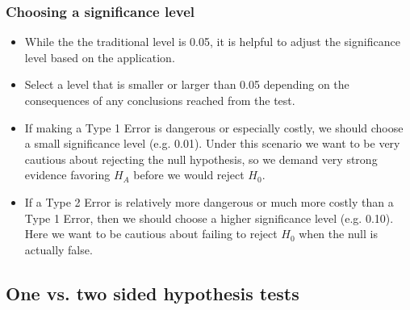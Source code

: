 \documentclass[notes,11pt, aspectratio=169]{beamer}
\begin{document}
\begin{frame}
\frametitle{Choosing a significance level}

\begin{itemize}

\item While the the traditional level is 0.05, it is helpful to adjust the significance level based on the application. 

\item Select a level that is smaller or larger than 0.05 depending on the consequences of any conclusions reached from the test.

\item If making a Type 1 Error is dangerous or especially costly, we should choose a small significance level (e.g. 0.01). Under this scenario we want to be very cautious about rejecting the null hypothesis, so we demand very strong evidence favoring $H_A$ before we would reject $H_0$.

\item If a Type 2 Error is relatively more dangerous or much more costly than a Type 1 Error, then we should choose a higher significance level (e.g. 0.10). Here we want to be cautious about failing to reject $H_0$ when the null is actually false.

\end{itemize}

\end{frame}

 
\subsection{One vs. two sided hypothesis tests}
 
 
\end{document}
